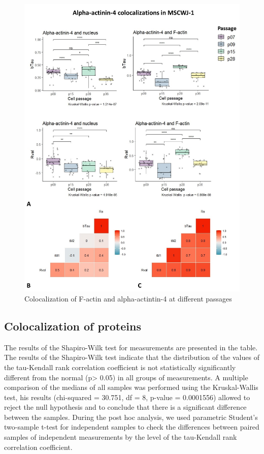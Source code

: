 \documentclass[english,authoryear]{elsarticle}
\begin{document}
\begin{figure}[hbt!]
\centering
\includegraphics[width=0.9\linewidth]{fig_a4-actin-col.jpg}
\caption{Colocalization of F-actin and alpha-actintin-4 at different passages}
\label{a4-actin-col}
\end{figure}


\subsection{Colocalization of proteins}

The results of the Shapiro-Wilk test for measurements are presented in the table.
The results of the Shapiro-Wilk test indicate that the distribution of the values of the tau-Kendall rank correlation coefficient is not statistically significantly different from the normal (p> 0.05) in all groups of measurements. A multiple comparison of the medians of all samples was performed using the Kruskal-Wallis test, his results (chi-squared = 30.751, df = 8, p-value = 0.0001556) allowed to reject the null hypothesis and to conclude that there is a significant difference between the samples.
During the post hoc analysis, we used parametric Student’s two-sample t-test for independent samples to check the differences between paired samples of independent measurements by the level of the tau-Kendall rank correlation coefficient.
\end{document}
